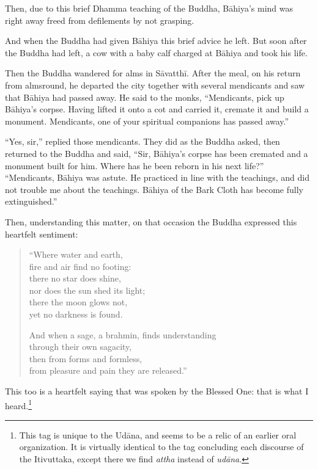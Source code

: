 \documentclass[12pt,openany]{book}%
\begin{document}
Then, due to this brief Dhamma teaching of the Buddha, \textsanskrit{Bāhiya}’s mind was right away freed from defilements by not grasping. 

And when the Buddha had given \textsanskrit{Bāhiya} this brief advice he left. But soon after the Buddha had left, a cow with a baby calf charged at \textsanskrit{Bāhiya} and took his life. 

Then the Buddha wandered for alms in \textsanskrit{Sāvatthī}. After the meal, on his return from almsround, he departed the city together with several mendicants and saw that \textsanskrit{Bāhiya} had passed away. He said to the monks, “Mendicants, pick up \textsanskrit{Bāhiya}’s corpse. Having lifted it onto a cot and carried it, cremate it and build a monument. Mendicants, one of your spiritual companions has passed away.” 

“Yes, sir,” replied those mendicants. They did as the Buddha asked, then returned to the Buddha and said, “Sir, \textsanskrit{Bāhiya}’s corpse has been cremated and a monument built for him. Where has he been reborn in his next life?” “Mendicants, \textsanskrit{Bāhiya} was astute. He practiced in line with the teachings, and did not trouble me about the teachings. \textsanskrit{Bāhiya} of the Bark Cloth has become fully extinguished.” 

Then, understanding this matter, on that occasion the Buddha expressed this heartfelt sentiment: 

\begin{verse}%
“Where water and earth, \\
fire and air find no footing: \\
there no star does shine, \\
nor does the sun shed its light; \\
there the moon glows not, \\
yet no darkness is found. 

And when a sage, a brahmin, finds understanding \\
through their own sagacity, \\
then from forms and formless, \\
from pleasure and pain they are released.” 

%
\end{verse}

This too is a heartfelt saying that was spoken by the Blessed One: that is what I heard.\footnote{This tag is unique to the \textsanskrit{Udāna}, and seems to be a relic of an earlier oral organization. It is virtually identical to the tag concluding each discourse of the Itivuttaka, except there we find \textit{attha} instead of \textit{\textsanskrit{udāna}}. } 
\end{document}
